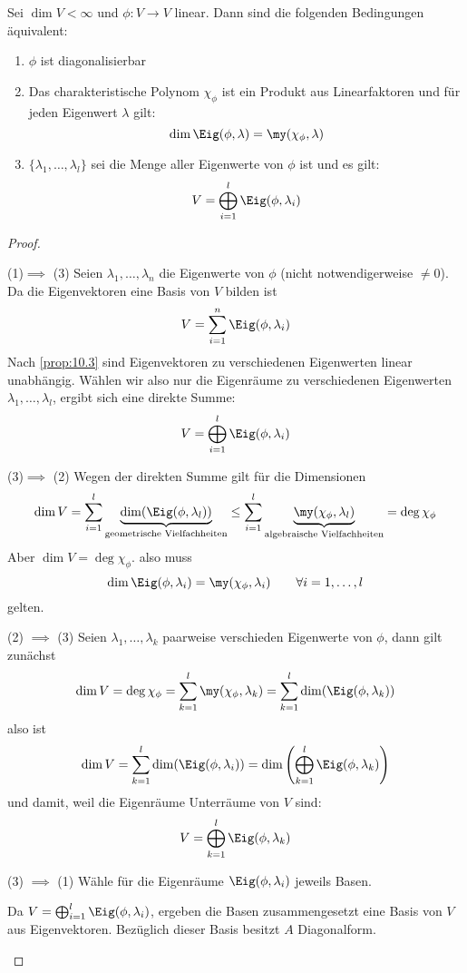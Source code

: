 \documentclass[a4paper, 10pt]{scrbook}
\begin{document}
\begin{thm}
\label{11.3}
Sei $\dim V <\infty$ und $\phi:V \to V$ linear.
Dann sind die folgenden Bedingungen äquivalent:
\begin{enumerate}
\item $\phi$ ist diagonalisierbar
\item Das charakteristische Polynom $\chi_\phi$ ist ein Produkt aus Linearfaktoren und für jeden Eigenwert $\lambda$ gilt:
\[
\dim \Eig (\phi, \lambda) = \my(\chi_\phi,\lambda)
\]
\item $\{\lambda_1,\dotsc, \lambda_l\}$ sei die Menge aller Eigenwerte von $\phi$ ist und es gilt:
\[
V=\bigoplus_{i=1}^l \Eig(\phi, \lambda_i)
\]
\end{enumerate}

\begin{proof}
	\begin{seg}{(1)$\implies$ (3)}
Seien $\lambda_1,\dotsc, \lambda_n$ die Eigenwerte von $\phi$ (nicht notwendigerweise $\neq 0$).
Da die Eigenvektoren eine Basis von $V$ bilden ist
\[
	V = \sum_{i=1}^n \Eig(\phi,\lambda_i)
\]
Nach \ref{prop:10.3} sind Eigenvektoren zu verschiedenen Eigenwerten linear unabhängig.
Wählen wir also nur die Eigenräume zu verschiedenen Eigenwerten $\lambda_1,\dotsc,\lambda_l$, ergibt sich eine direkte Summe:
\[
V = \bigoplus_{i=1}^l \Eig(\phi,\lambda_i)
\]
\end{seg}
\begin{seg}{(3)$\implies$ (2)}
Wegen der direkten Summe gilt für die Dimensionen
\[
	\dim V = \sum_{i=1}^l\limits \underbrace{\dim ( \Eig(\phi, \lambda_l) )}_\text{geometrische Vielfachheiten} \le \sum_{i=1}^l \underbrace{\my(\chi_\phi, \lambda_l)}_{\text{algebraische Vielfachheiten}} = \deg \chi_\phi
\]
Aber $\dim V = \deg \chi_\phi$. also muss
\[
\dim  \Eig(\phi, \lambda_i) =\my(\chi_\phi, \lambda_i) \qquad \forall i=1,\dotsc,l
\]
gelten.
\end{seg}
\begin{seg}{(2) $\implies$ (3)}
Seien $\lambda_1,\dotsc,\lambda_k$ paarweise verschieden Eigenwerte von $\phi$, dann gilt zunächst
\[
	\dim V = \deg \chi_\phi = \sum_{k=1}^l \my(\chi_\phi,\lambda_k) = \sum_{k=1}^l \dim ( \Eig(\phi,\lambda_k) )
\]
also ist
\[
\dim V =\sum_{k=1}^l \dim (\Eig(\phi,\lambda_i)) = \dim\left (\bigoplus_{k=1}^l \Eig(\phi, \lambda_k)\right )
\]
und damit, weil die Eigenräume Unterräume von $V$ sind:
\[
V=\bigoplus_{k=1}^l \Eig(\phi,\lambda_k)
\]
\end{seg}
\begin{seg}{(3) $\implies$ (1)}
Wähle für die Eigenräume $\Eig(\phi,\lambda_i)$ jeweils Basen.

Da $V = \bigoplus_{i=1}^l \Eig(\phi,\lambda_i)$, ergeben die Basen zusammengesetzt eine Basis von $V$ aus Eigenvektoren.
Bezüglich dieser Basis besitzt $A$ Diagonalform.
\end{seg}
\end{proof}
\end{thm}
\end{document}
